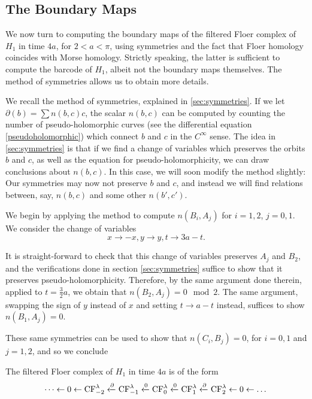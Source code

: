\subsection{The Boundary Maps}

We now turn to computing the boundary maps of the filtered Floer complex of $H_1$ in time $4a$, for $2 < a < \pi$, using symmetries and the fact that Floer homology coincides with Morse homology. Strictly speaking, the latter is sufficient to compute the barcode of $H_1$, albeit not the boundary maps themselves. The method of symmetries allows us to obtain more details.

We recall the method of symmetries, explained in \ref{sec:symmetries}. If we let $\partial(b) = \sum n(b,c) c$, the scalar $n(b,c)$ can be computed by counting the number of pseudo-holomorphic curves (see the differential equation \eqref{pseudoholomorphic}) which connect $b$ and $c$ in the $C^\infty$ sense. The idea in \ref{sec:symmetries} is that if we find a change of variables which preserves the orbits $b$ and $c$, as well as the equation for pseudo-holomorphicity, we can draw conclusions about $n(b,c)$. In this case, we will soon modify the method slightly: Our symmetries may now not preserve $b$ and $c$, and instead we will find relations between, say, $n(b,c)$ and some other $n(b', c')$.

We begin by applying the method to compute $n(B_i, A_j)$ for $i = 1, 2$, $j = 0, 1$. We consider the change of variables
\begin{equation}
x \to -x, y \to y, t \to 3a - t.
\end{equation}

It is straight-forward to check that this change of variables preserves $A_j$ and $B_2$, and the verifications done in section \ref{sec:symmetries} suffice to show that it preserves pseudo-holomorphicity. Therefore, by the same argument done therein, applied to $t = \frac32 a$, we obtain that $n(B_2, A_j) = 0 \mod 2$. The same argument, swapping the sign of $y$ instead of $x$ and setting $t \to a - t$ instead, suffices to show $n(B_1, A_j) = 0$.

These same symmetries can be used to show that $n(C_i, B_j) = 0$, for $i = 0, 1$ and $j = 1, 2$, and so we conclude
\begin{prop}\label{fch14a1}
The filtered Floer complex of $H_1$ in time $4a$ is of the form
\begin{equation}
\dots \leftarrow 0 \leftarrow \mathrm{CF}_{-2}^\lambda \xleftarrow{\partial} \mathrm{CF}_{-1}^\lambda \xleftarrow{0} \mathrm{CF}_0^\lambda \xleftarrow{0} \mathrm{CF}_1^\lambda \xleftarrow{\partial} \mathrm{CF}_2^\lambda \leftarrow 0 \leftarrow \dots
\end{equation}
\end{prop}

